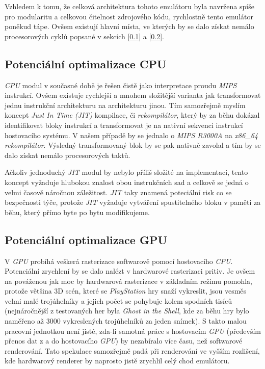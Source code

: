 Vzhledem k tomu, že celková architektura tohoto emulátoru byla navržena spíše pro modularitu a celkovou čitelnost zdrojového kódu, 
rychlostně tento emulátor poněkud tápe. Ovšem existují hlavní místa, ve kterých by se dalo získat nemálo procesorových cyklů popsané v sekcích [\ref{cpu-optimizations}] a [\ref{gpu-optimalization}].

\subsection{Potenciální optimalizace CPU} \label{cpu-optimizations}

\textit{CPU} modul v současné době je řešen čistě jako interpretace proudu \textit{MIPS} instrukcí.
Ovšem existuje rychlejší a mnohem složitější varianta jak transformovat jednu instrukční architekturu na architekturu jinou.
Tím samozřejmě myslím koncept \textit{Just In Time (JIT)} kompilace, či \textit{rekompilátor}, který by za běhu dokázal identifikovat
bloky instrukcí a transformovat je na nativní sekvenci instrukcí hostovacího systému. V našem případě by se
jednalo o \textit{MIPS R3000A} na \textit{x86\_64} \textit{rekompilátor}. Výsledný transformovaný blok by se pak nativně
zavolal a tím by se dalo získat nemálo procesorových taktů.

Ačkoliv jednoduchý \textit{JIT} modul by nebylo příliš složité na implementaci, tento koncept vyžaduje hlubokou znalost obou instrukčních sad
a celkově se jedná o velmi časově náročnou záležitost. \textit{JIT} taky znamená poteciální risk co se bezpečnosti týče,
protože \textit{JIT} vyžaduje vytváření spustitelného bloku v paměti za běhu, který přímo byte po bytu modifikujeme.

\subsection{Potenciální optimalizace GPU} \label{gpu-optimalization}

V \textit{GPU} probíhá veškerá rasterizace softwarově pomocí hostovacího \textit{CPU}. Potenciální zrychlení by se dalo nalézt v hardwarové rasterizaci
pritiv. Je ovšem na pováženou jak moc by hardwarová rasterizace v základním režimu pomohla, protože většina 3D scén, které se \textit{PlayStation} hry
snaží vykreslit, jsou vesměs velmi malé trojúhelníky a jejich počet se pohybuje kolem spodních tisíců (nejnáročnější z testovaných her byla \textit{Ghost in the Shell}, kde za běhu hry bylo naměřeno až 3000 vykreslených trojúhelníků za jeden snímek). S takto malou pracovní jednotkou
není jisté, zda-li samotná práce s hostovacím \textit{GPU} (především přenos dat z a do hostovacího \textit{GPU}) by nezabíralo více času, než softwarové renderování. Tato spekulace samozřejmě padá při renderování ve vyšším rozlišení, kde hardwarový renderer by naprosto jistě zrychlil celý chod emulátoru.


